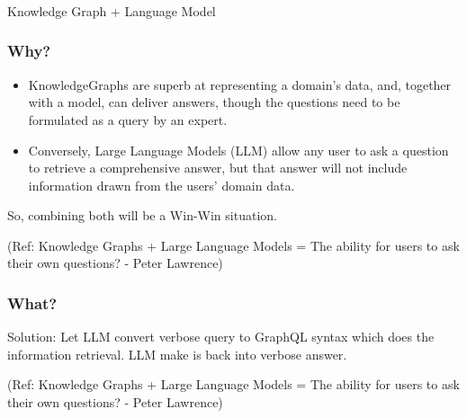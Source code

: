 \begin{frame}[fragile]\frametitle{}
\begin{center}
{\Large Knowledge Graph + Language Model}

\end{center}
\end{frame}

\begin{frame}[fragile]\frametitle{Why?}

\begin{itemize}
\item KnowledgeGraphs are superb at representing a domain’s data, and, together with a model, can deliver answers, though the questions need to be formulated as a query by an expert.
\item Conversely, Large Language Models (LLM) allow any user to ask a question to retrieve a comprehensive answer, but that answer will not include information drawn from the users’ domain data.
\end{itemize}
	
So, combining both will be a Win-Win situation.

{\tiny (Ref: Knowledge Graphs + Large Language Models = The ability for users to ask their own questions? - Peter Lawrence)}

\end{frame}

\begin{frame}[fragile]\frametitle{What?}

Solution: Let LLM convert verbose query to GraphQL syntax which does the information retrieval. LLM make is back into verbose answer.
	
{\tiny (Ref: Knowledge Graphs + Large Language Models = The ability for users to ask their own questions? - Peter Lawrence)}

\end{frame}

